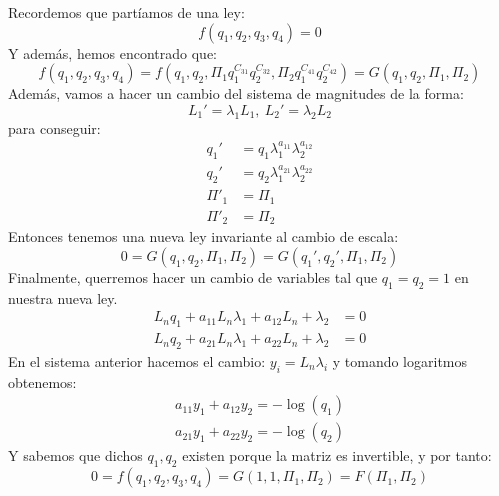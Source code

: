 \begin{eg}
    Recordemos que partíamos de una ley:
    $$
        f(q_1, q_2, q_3, q_4) = 0
    $$
    Y además, hemos encontrado que:
    $$
        f(q_1, q_2, q_3, q_4) = f(q_1, q_2, \Pi_1 q_1^{C_{31}} q_2^{C_{32}}, \Pi_2 q_1^{C_{41}} q_2^{C_{42}}) = G(q_1, q_2, \Pi_1, \Pi_2)
    $$
    Además, vamos a hacer un cambio del sistema de magnitudes de la forma:
    $$
        L_1' = \lambda_1 L_1,\ L_2' = \lambda_2 L_2
    $$
    para conseguir:
    \begin{align*}
        q_1' &= q_1 \lambda_1^{a_11} \lambda_2^{a_12}\\
        q_2' &= q_2 \lambda_1^{a_21} \lambda_2^{a_22}\\
        \Pi'_1 &= \Pi_1\\
        \Pi'_2 &= \Pi_2
    \end{align*}
    Entonces tenemos una nueva ley invariante al cambio de escala:
    $$
        0 = G(q_1, q_2, \Pi_1, \Pi_2) = G(q_1', q_2', \Pi_1, \Pi_2)
    $$
    Finalmente, querremos hacer un cambio de variables tal que $q_1 = q_2 = 1$ en nuestra nueva ley.
    \begin{align*}
        L_nq_1 + a_{11} L_n \lambda_1 + a_{12} L_n + \lambda_2 &= 0\\
        L_nq_2 + a_{21} L_n \lambda_1 + a_{22} L_n + \lambda_2 &= 0
    \end{align*}
    En el sistema anterior hacemos el cambio: $y_i = L_n \lambda_i$ y tomando logaritmos obtenemos:
    \begin{align*}
        a_{11} y_1 + a_{12} y_2 = - \log(q_1)\\
        a_{21} y_1 + a_{22} y_2 = - \log(q_2)
    \end{align*}
    Y sabemos que dichos $q_1, q_2$ existen porque la matriz es invertible, y por tanto:
    $$
        0 = f(q_1, q_2, q_3, q_4) = G(1, 1, \Pi_1, \Pi_2) = F(\Pi_1, \Pi_2)
    $$
\end{eg}


